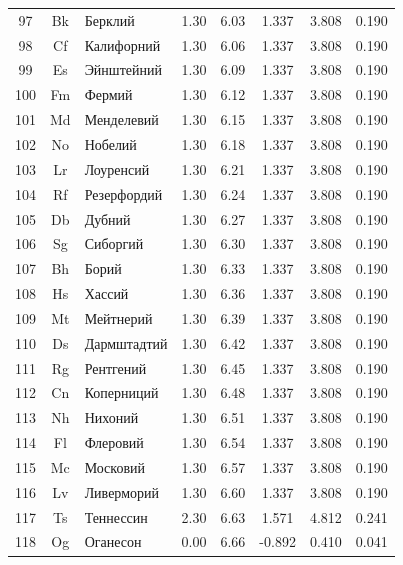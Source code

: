 \documentclass[12pt,a4paper]{article}
\theoremstyle{remark}
\begin{document}
\begin{longtable}{|c|c|p{2.5cm}|c|c|c|c|c|}
		97 & Bk & Берклий & 1.30 & 6.03 & 1.337 & 3.808 & 0.190 \\
		98 & Cf & Калифорний & 1.30 & 6.06 & 1.337 & 3.808 & 0.190 \\
		99 & Es & Эйнштейний & 1.30 & 6.09 & 1.337 & 3.808 & 0.190 \\
		100 & Fm & Фермий & 1.30 & 6.12 & 1.337 & 3.808 & 0.190 \\
		101 & Md & Менделевий & 1.30 & 6.15 & 1.337 & 3.808 & 0.190 \\
		102 & No & Нобелий & 1.30 & 6.18 & 1.337 & 3.808 & 0.190 \\
		103 & Lr & Лоуренсий & 1.30 & 6.21 & 1.337 & 3.808 & 0.190 \\
		104 & Rf & Резерфордий & 1.30 & 6.24 & 1.337 & 3.808 & 0.190 \\
		105 & Db & Дубний & 1.30 & 6.27 & 1.337 & 3.808 & 0.190 \\
		106 & Sg & Сиборгий & 1.30 & 6.30 & 1.337 & 3.808 & 0.190 \\
		107 & Bh & Борий & 1.30 & 6.33 & 1.337 & 3.808 & 0.190 \\
		108 & Hs & Хассий & 1.30 & 6.36 & 1.337 & 3.808 & 0.190 \\
		109 & Mt & Мейтнерий & 1.30 & 6.39 & 1.337 & 3.808 & 0.190 \\
		110 & Ds & Дармштадтий & 1.30 & 6.42 & 1.337 & 3.808 & 0.190 \\
		111 & Rg & Рентгений & 1.30 & 6.45 & 1.337 & 3.808 & 0.190 \\
		112 & Cn & Коперниций & 1.30 & 6.48 & 1.337 & 3.808 & 0.190 \\
		113 & Nh & Нихоний & 1.30 & 6.51 & 1.337 & 3.808 & 0.190 \\
		114 & Fl & Флеровий & 1.30 & 6.54 & 1.337 & 3.808 & 0.190 \\
		115 & Mc & Московий & 1.30 & 6.57 & 1.337 & 3.808 & 0.190 \\
		116 & Lv & Ливерморий & 1.30 & 6.60 & 1.337 & 3.808 & 0.190 \\
		117 & Ts & Теннессин & 2.30 & 6.63 & 1.571 & 4.812 & 0.241 \\
		118 & Og & Оганесон & 0.00 & 6.66 & -0.892 & 0.410 & 0.041 \\
		\hline
	\end{longtable}
	
\end{document}
